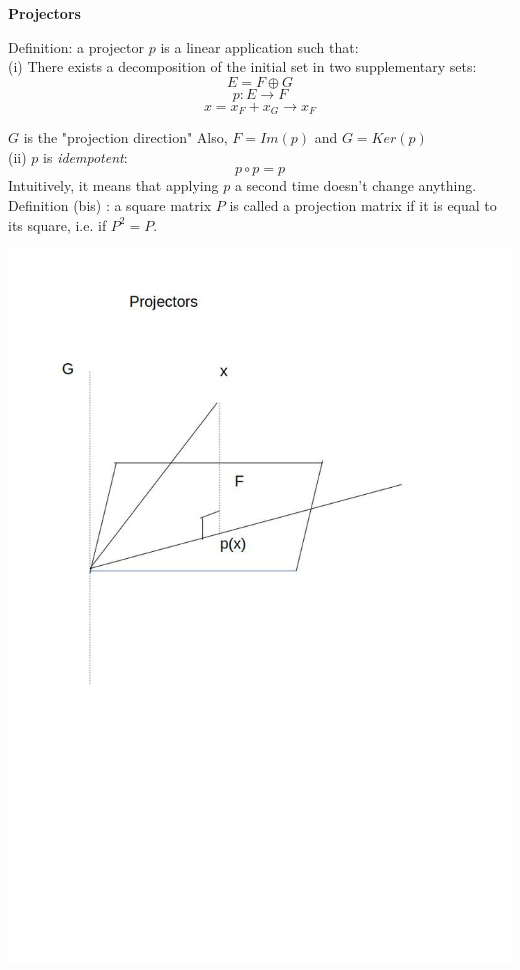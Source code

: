 {\fontsize{12pt}{22pt} \textbf{Projectors}\par}

\vspace{5mm}

Definition: a projector $p$ is a linear application such that: \\

(i) There exists a decomposition of the initial set in two supplementary sets: \\
$$E = F \oplus G$$
$$p: E \to F$$
$$x = x_F + x_G \to x_F$$

$G$ is the "projection direction"
Also, $F = Im(p)$ and $G = Ker(p)$ \\

(ii) $p$ is \textit{idempotent}:
$$p \circ p=p$$
Intuitively, it means that applying $p$ a second time doesn't change anything. \\

Definition (bis) : a square matrix $P$ is called a projection matrix if it is equal to its square, i.e. if $P^2 = P$.


\includegraphics{Projectors.jpeg}
